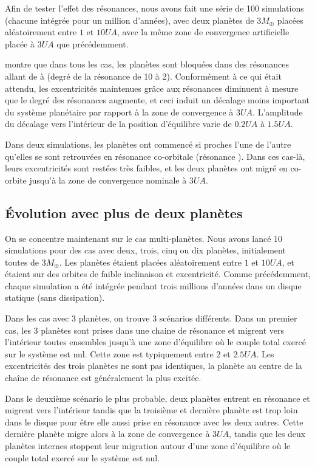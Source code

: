 Afin de tester l'effet des résonances, nous avons fait une série de 100 simulations (chacune intégrée pour un million d'années),
avec deux planètes de $3\unit{M_\oplus}$ placées aléatoirement entre $1$ et $10\unit{UA}$, avec la même zone de convergence
artificielle placée à $3\unit{UA}$ que précédemment. 

 montre que dans tous les cas, les planètes sont bloquées dans des résonances allant de  à  (degré de la résonance de 10 à 2). Conformément à ce qui était attendu, les excentricités maintenues grâce aux résonances diminuent à mesure que le degré des résonances augmente, et ceci induit un décalage moins important du système planétaire par rapport à la zone de convergence à $3\unit{UA}$. L'amplitude du décalage vers l'intérieur de la position d'équilibre varie de $0.2\unit{UA}$ à $1.5\unit{UA}$. 

Dans deux simulations, les planètes ont commencé si proches l'une de l'autre qu'elles se sont retrouvées en résonance
co-orbitale (résonance ). Dans ces cas-là, leurs excentricités sont restées très faibles, et les deux planètes ont
migré en co-orbite jusqu'à la zone de convergence nominale à $3\unit{UA}$. 

\subsection{Évolution avec plus de deux planètes}
On se concentre maintenant sur le cas multi-planètes. Nous avons lancé 10 simulations pour des cas avec deux, trois, cinq ou dix planètes, initialement toutes de $3\unit{M_\oplus}$. Les planètes étaient placées aléatoirement entre $1$ et $10\unit{UA}$, et étaient sur des orbites de faible inclinaison et excentricité. Comme précédemment, chaque simulation a été intégrée pendant trois millions d'années dans un disque statique (sans dissipation). 

\bigskip

Dans les cas avec 3 planètes, on trouve 3 scénarios différents. Dans un premier cas, les 3 planètes sont prises dans une chaine de résonance et migrent vers l'intérieur toutes ensembles jusqu'à une zone d'équilibre où le couple total exercé sur le système est nul. Cette zone est typiquement entre $2$ et $2.5\unit{UA}$. Les excentricités des trois planètes ne sont pas identiques, la planète au centre de la chaîne de résonance est généralement la plus excitée. 

Dans le deuxième scénario le plus probable, deux planètes entrent en résonance et migrent vers l'intérieur tandis que la troisième et dernière planète est trop loin dans le disque pour être elle aussi prise en résonance avec les deux autres. Cette dernière planète migre alors à la zone de convergence à $3\unit{UA}$, tandis que les deux planètes internes stoppent leur migration autour d'une zone d'équilibre où le couple total exercé sur le système est nul. 

